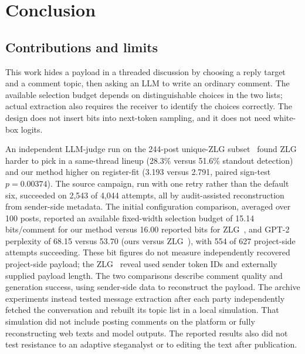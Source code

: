 \section{Conclusion}
\label{sec:conclusion}

\subsection{Contributions and limits}

This work hides a payload in a threaded discussion by choosing a reply target and a comment topic, then asking an LLM to write an ordinary comment.
The available selection budget depends on distinguishable choices in the two lists; actual extraction also requires the receiver to identify the choices correctly.
The design does not insert bits into next-token sampling, and it does not need white-box logits.

An independent LLM-judge run on the 244-post unique-ZLG subset~\cite{lin2024zero} found ZLG~\cite{lin2024zero} harder to pick in a same-thread lineup (28.3\% versus 51.6\% standout detection) and our method higher on register-fit (3.193 versus 2.791, paired sign-test $p=0.00374$).
The source campaign, run with one retry rather than the default six, succeeded on 2{,}543 of 4{,}044 attempts, all by audit-assisted reconstruction from sender-side metadata.
The initial configuration comparison, averaged over 100 posts, reported an available fixed-width selection budget of 15.14 bits/comment for our method versus 16.00 reported bits for ZLG~\cite{lin2024zero}, and GPT-2 perplexity of 68.15 versus 53.70 (ours versus ZLG~\cite{lin2024zero}), with 554 of 627 project-side attempts succeeding. These bit figures do not measure independently recovered project-side payload; the ZLG~\cite{lin2024zero} reveal used sender token IDs and externally supplied payload length.
The two comparisons describe comment quality and generation success, using sender-side data to reconstruct the payload. The archive experiments instead tested message extraction after each party independently fetched the conversation and rebuilt its topic list in a local simulation. That simulation did not include posting comments on the platform or fully reconstructing web texts and model outputs. The reported results also did not test resistance to an adaptive steganalyst or to editing the text after publication.


